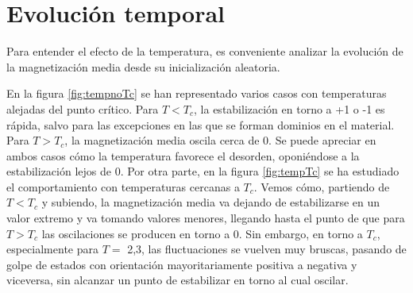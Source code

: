 \documentclass{scrartcl}
\begin{document}
\section{Evolución temporal}
Para entender el efecto de la temperatura, es conveniente analizar la evolución de la magnetización media desde su inicialización aleatoria.\par
En la figura \ref{fig:tempnoTc} se han representado varios casos con temperaturas alejadas del punto crítico. Para $T<T_c$, la estabilización en torno a +1 o -1 es rápida, salvo para las excepciones en las que se forman dominios en el material. Para $T>T_c$, la magnetización media oscila cerca de 0. Se puede apreciar en ambos casos cómo la temperatura favorece el desorden, oponiéndose a la estabilización lejos de 0.
Por otra parte, en la figura \ref{fig:tempTc} se ha estudiado el comportamiento con temperaturas cercanas a $T_c$. Vemos cómo, partiendo de $T<T_c$ y subiendo, la magnetización media va dejando de estabilizarse en un valor extremo y va tomando valores menores, llegando hasta el punto de que para $T>T_c$ las oscilaciones se producen en torno a 0. Sin embargo, en torno a $T_c$, especialmente para $T=$ 2,3, las fluctuaciones se vuelven muy bruscas, pasando de golpe de estados con orientación mayoritariamente positiva a negativa y viceversa, sin alcanzar un punto de estabilizar en torno al cual oscilar.
\end{document}
